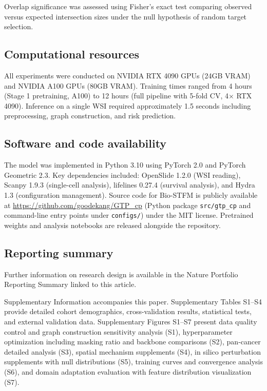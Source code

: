 \documentclass[pdflatex,sn-nature]{sn-jnl}%
\theoremstyle{thmstyleone}%
\theoremstyle{thmstyletwo}%
\theoremstyle{thmstylethree}%
\begin{document}
Overlap significance was assessed using Fisher's exact test comparing observed versus expected intersection sizes under the null hypothesis of random target selection.

\subsection{Computational resources}

All experiments were conducted on NVIDIA RTX 4090 GPUs (24GB VRAM) and NVIDIA A100 GPUs (80GB VRAM). Training times ranged from 4 hours (Stage 1 pretraining, A100) to 12 hours (full pipeline with 5-fold CV, 4$\times$ RTX 4090). Inference on a single WSI required approximately 1.5 seconds including preprocessing, graph construction, and risk prediction.

\subsection{Software and code availability}

The model was implemented in Python 3.10 using PyTorch 2.0 and PyTorch Geometric 2.3\cite{bib31}. Key dependencies included: OpenSlide 1.2.0 (WSI reading), Scanpy 1.9.3 (single-cell analysis)\cite{bib27}, lifelines 0.27.4 (survival analysis)\cite{bib30}, and Hydra 1.3 (configuration management). Source code for Bio-STFM is publicly available at \url{https://github.com/goodekang/GTP_cp} (Python package \texttt{src/gtp\_cp} and command-line entry points under \texttt{configs/}) under the MIT license. Pretrained weights and analysis notebooks are released alongside the repository.

\subsection{Reporting summary}

Further information on research design is available in the Nature Portfolio Reporting Summary linked to this article.

\backmatter


Supplementary Information accompanies this paper. Supplementary Tables S1--S4 provide detailed cohort demographics, cross-validation results, statistical tests, and external validation data. Supplementary Figures S1--S7 present data quality control and graph construction sensitivity analysis (S1), hyperparameter optimization including masking ratio and backbone comparisons (S2), pan-cancer detailed analysis (S3), spatial mechanism supplements (S4), in silico perturbation supplements with null distributions (S5), training curves and convergence analysis (S6), and domain adaptation evaluation with feature distribution visualization (S7).
\end{document}
